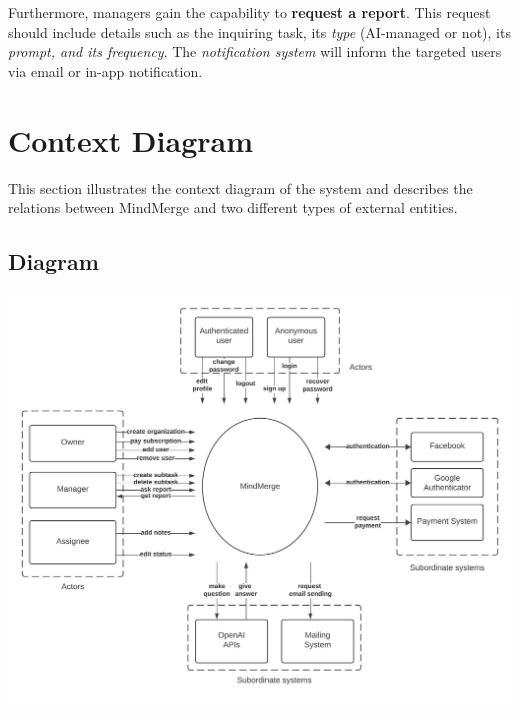 \documentclass{article}
\begin{document}
Furthermore, managers gain the capability to \textbf{request a report}. This request should include details such as the inquiring task, its \textit{type} (AI-managed or not), its \textit{prompt, and its frequency}. The \textit{notification system} will inform the targeted users via email or in-app notification.

\section{Context Diagram}
This section illustrates the context diagram of the system and describes the relations between MindMerge and two different types of external entities.

\subsection{Diagram}
\includegraphics[width=\textwidth, height=\textheight, keepaspectratio]{images/context_diagram.jpeg}
\end{document}
